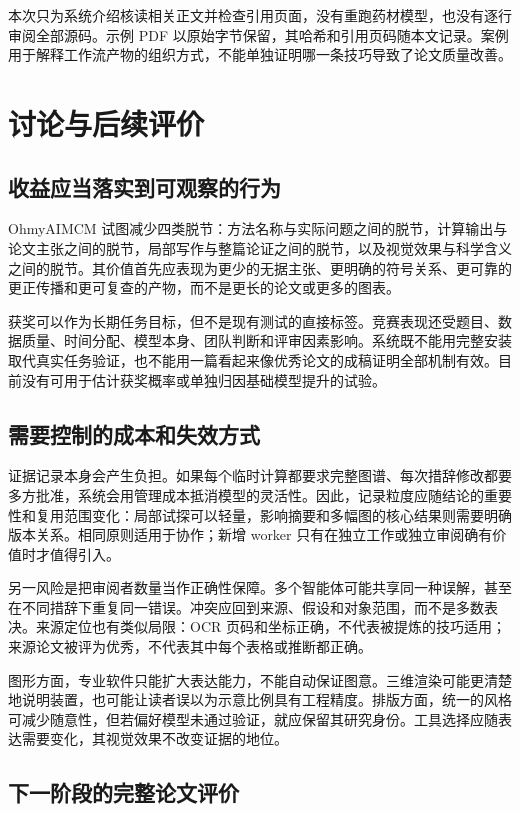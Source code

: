 \documentclass[UTF8,a4paper,zihao=-4,fontset=fandol]{ctexart}
\newcommand{\sys}{\textsf{OhmyAIMCM}}
\begin{document}
本次只为系统介绍核读相关正文并检查引用页面，没有重跑药材模型，也没有逐行审阅全部源码。示例 PDF 以原始字节保留，其哈希和引用页码随本文记录。案例用于解释工作流产物的组织方式，不能单独证明哪一条技巧导致了论文质量改善。

\section{讨论与后续评价}

\subsection{收益应当落实到可观察的行为}

\sys{} 试图减少四类脱节：方法名称与实际问题之间的脱节，计算输出与论文主张之间的脱节，局部写作与整篇论证之间的脱节，以及视觉效果与科学含义之间的脱节。其价值首先应表现为更少的无据主张、更明确的符号关系、更可靠的更正传播和更可复查的产物，而不是更长的论文或更多的图表。

获奖可以作为长期任务目标，但不是现有测试的直接标签。竞赛表现还受题目、数据质量、时间分配、模型本身、团队判断和评审因素影响。系统既不能用完整安装取代真实任务验证，也不能用一篇看起来像优秀论文的成稿证明全部机制有效。目前没有可用于估计获奖概率或单独归因基础模型提升的试验。

\subsection{需要控制的成本和失效方式}

证据记录本身会产生负担。如果每个临时计算都要求完整图谱、每次措辞修改都要多方批准，系统会用管理成本抵消模型的灵活性。因此，记录粒度应随结论的重要性和复用范围变化：局部试探可以轻量，影响摘要和多幅图的核心结果则需要明确版本关系。相同原则适用于协作；新增 worker 只有在独立工作或独立审阅确有价值时才值得引入。

另一风险是把审阅者数量当作正确性保障。多个智能体可能共享同一种误解，甚至在不同措辞下重复同一错误。冲突应回到来源、假设和对象范围，而不是多数表决。来源定位也有类似局限：OCR 页码和坐标正确，不代表被提炼的技巧适用；来源论文被评为优秀，不代表其中每个表格或推断都正确。

图形方面，专业软件只能扩大表达能力，不能自动保证图意。三维渲染可能更清楚地说明装置，也可能让读者误以为示意比例具有工程精度。排版方面，统一的风格可减少随意性，但若偏好模型未通过验证，就应保留其研究身份。工具选择应随表达需要变化，其视觉效果不改变证据的地位。

\subsection{下一阶段的完整论文评价}
\end{document}
